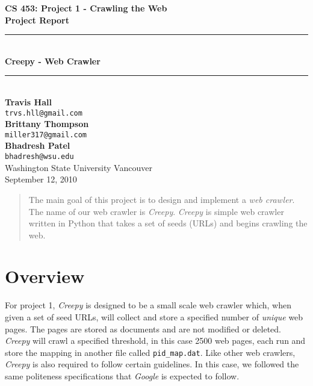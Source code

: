 \documentclass[letterpaper,11pt,twoside]{article}
\begin{document}
\begin{titlepage}
   \begin{center}
       {\Large \textbf{CS 453: Project 1 - Crawling the Web}}\\[0.5cm]
       {\Large \textbf{Project Report}}\\[3.0cm]

       {\rule{\linewidth}{0.5mm}} \\[0.5cm]
       {\Huge \textbf{Creepy - Web Crawler}}\\[0.4cm] 
       {\rule{\linewidth}{0.5mm}} \\[2.0cm]

       \textbf{Travis Hall}\\
       \texttt{trvs.hll@gmail.com}\\[0.5cm]
       \textbf{Brittany Thompson}\\
       \texttt{miller317@gmail.com}\\[0.5cm]
       \textbf{Bhadresh Patel}\\
       \texttt{bhadresh@wsu.edu}\\[0.5cm]

       \vfill
       Washington State University Vancouver\\
       September 12, 2010
   \end{center}
\end{titlepage}

\begin{abstract}
The main goal of this project is to design and implement a \emph{web crawler}. The name of our web crawler is \emph{Creepy}. \emph{Creepy} is simple web crawler written in Python that takes a set of seeds (URLs) and begins crawling the web.
\end{abstract}

\section{Overview}
For project 1, \emph{Creepy} is designed to be a small scale web crawler which, when given a set of seed URLs, will collect and store a specified number of \emph{unique} web pages. The pages are stored as documents and are not modified or deleted. \emph{Creepy} will crawl a specified threshold, in this case 2500 web pages, each run and store the mapping in another file called \texttt{pid\_map.dat}. Like other web crawlers, \emph{Creepy} is also required to follow certain guidelines. In this case, we followed the same politeness specifications that \emph{Google} is expected to follow. 
\end{document}
